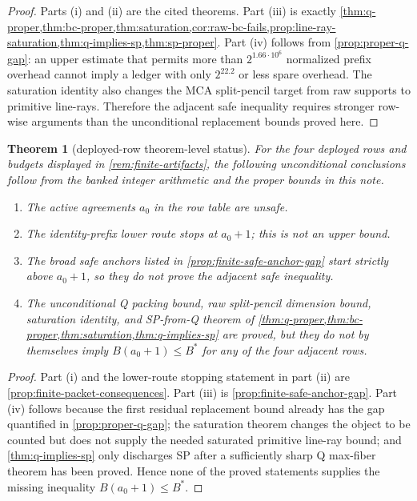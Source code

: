 \documentclass[a4paper,11pt]{amsart}
\newtheorem{theorem}{Theorem}[section]
\theoremstyle{remark}
\begin{document}
\begin{proof}
Parts (i) and (ii) are the cited theorems.  Part (iii) is exactly \cref{thm:q-proper,thm:bc-proper,thm:saturation,cor:raw-bc-fails,prop:line-ray-saturation,thm:q-implies-sp,thm:sp-proper}.  Part (iv) follows from \cref{prop:proper-q-gap}: an upper estimate that permits more than \(2^{1.66\cdot10^6}\) normalized prefix overhead cannot imply a ledger with only \(2^{22.2}\) or less spare overhead.  The saturation identity also changes the MCA split-pencil target from raw supports to primitive line-rays.  Therefore the adjacent safe inequality requires stronger row-wise arguments than the unconditional replacement bounds proved here.
\end{proof}

\begin{theorem}[deployed-row theorem-level status]\label{thm:deployed-row-status}
For the four deployed rows and budgets displayed in \cref{rem:finite-artifacts}, the following unconditional conclusions follow from the banked integer arithmetic and the proper bounds in this note.
\begin{enumerate}[label=\textup{(\roman*)}]
\item The active agreements \(a_0\) in the row table are unsafe.
\item The identity-prefix lower route stops at \(a_0+1\); this is not an upper bound.
\item The broad safe anchors listed in \cref{prop:finite-safe-anchor-gap} start strictly above \(a_0+1\), so they do not prove the adjacent safe inequality.
\item The unconditional Q packing bound, raw split-pencil dimension bound, saturation identity, and SP-from-Q theorem of \cref{thm:q-proper,thm:bc-proper,thm:saturation,thm:q-implies-sp} are proved, but they do not by themselves imply \(B(a_0+1)\le B^*\) for any of the four adjacent rows.
\end{enumerate}
\end{theorem}

\begin{proof}
Part (i) and the lower-route stopping statement in part (ii) are \cref{prop:finite-packet-consequences}.  Part (iii) is \cref{prop:finite-safe-anchor-gap}.  Part (iv) follows because the first residual replacement bound already has the gap quantified in \cref{prop:proper-q-gap}; the saturation theorem changes the object to be counted but does not supply the needed saturated primitive line-ray bound; and \cref{thm:q-implies-sp} only discharges SP after a sufficiently sharp Q max-fiber theorem has been proved.  Hence none of the proved statements supplies the missing inequality \(B(a_0+1)\le B^*\).
\end{proof}
\end{document}
